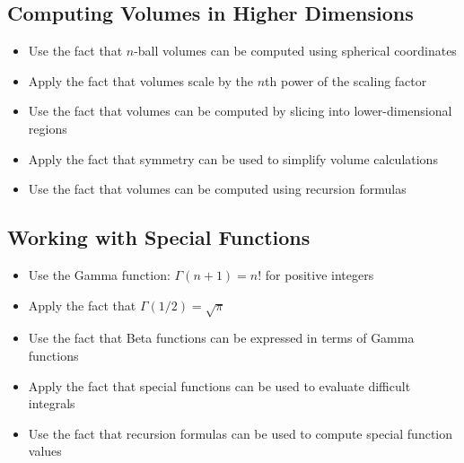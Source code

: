 \subsection*{Computing Volumes in Higher Dimensions}
\begin{itemize}
\item Use the fact that $n$-ball volumes can be computed using spherical coordinates
\item Apply the fact that volumes scale by the $n$th power of the scaling factor
\item Use the fact that volumes can be computed by slicing into lower-dimensional regions
\item Apply the fact that symmetry can be used to simplify volume calculations
\item Use the fact that volumes can be computed using recursion formulas
\end{itemize}

\subsection*{Working with Special Functions}
\begin{itemize}
\item Use the Gamma function: $\Gamma(n+1) = n!$ for positive integers
\item Apply the fact that $\Gamma(1/2) = \sqrt{\pi}$
\item Use the fact that Beta functions can be expressed in terms of Gamma functions
\item Apply the fact that special functions can be used to evaluate difficult integrals
\item Use the fact that recursion formulas can be used to compute special function values
\end{itemize}